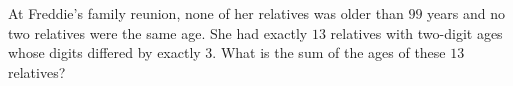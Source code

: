 At Freddie's family reunion, none of her relatives was older than $99$ years and no two relatives were the same age. She had exactly $13$ relatives with two-digit ages whose digits differed by exactly $3$. What is the sum of the ages of these $13$ relatives?
